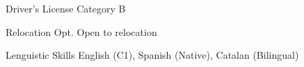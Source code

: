

\begin{cvskills}


\cvskill
  {Driver's License}
  {Category B}

\cvskill
  {Relocation Opt.}
  {Open to relocation}

\cvskill
  {Lenguistic Skills}
  {English (C1), Spanish (Native), Catalan (Bilingual)}
\end{cvskills}
